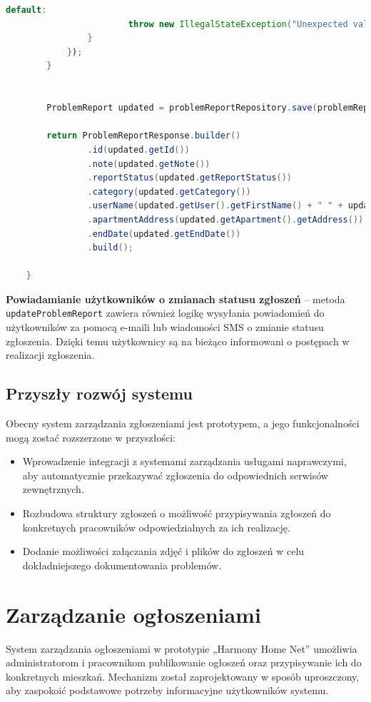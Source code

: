 \begin{lstlisting}[language=Java, style=JavaStyle, caption=Aktualizacja zgłoszenia problemu.]
                    default:
                        throw new IllegalStateException("Unexpected value: " + notificationType.getType());
                }
            });
        }


        ProblemReport updated = problemReportRepository.save(problemReportToUpdate);

        return ProblemReportResponse.builder()
                .id(updated.getId())
                .note(updated.getNote())
                .reportStatus(updated.getReportStatus())
                .category(updated.getCategory())
                .userName(updated.getUser().getFirstName() + " " + updated.getUser().getLastName())
                .apartmentAddress(updated.getApartment().getAddress())
                .endDate(updated.getEndDate())
                .build();

    }
\end{lstlisting}

\textbf{Powiadamianie użytkowników o zmianach statusu zgłoszeń} -- metoda \texttt{updateProblemReport} zawiera również logikę wysyłania powiadomień do użytkowników za pomocą e-maili lub wiadomości SMS o zmianie statusu zgłoszenia. Dzięki temu użytkownicy są na bieżąco informowani o postępach w realizacji zgłoszenia.

\subsection{Przyszły rozwój systemu}
Obecny system zarządzania zgłoszeniami jest prototypem, a jego funkcjonalności mogą zostać rozszerzone w przyszłości:
\begin{itemize}
    \item Wprowadzenie integracji z systemami zarządzania usługami naprawczymi, aby automatycznie przekazywać zgłoszenia do odpowiednich serwisów zewnętrznych.
    \item Rozbudowa struktury zgłoszeń o możliwość przypisywania zgłoszeń do konkretnych pracowników odpowiedzialnych za ich realizację.
    \item Dodanie możliwości załączania zdjęć i plików do zgłoszeń w celu dokładniejszego dokumentowania problemów.
\end{itemize}


\section{Zarządzanie ogłoszeniami}

System zarządzania ogłoszeniami w prototypie „Harmony Home Net” umożliwia administratorom i pracownikom publikowanie ogłoszeń oraz przypisywanie ich do konkretnych mieszkań. Mechanizm został zaprojektowany w sposób uproszczony, aby zaspokoić podstawowe potrzeby informacyjne użytkowników systemu.


